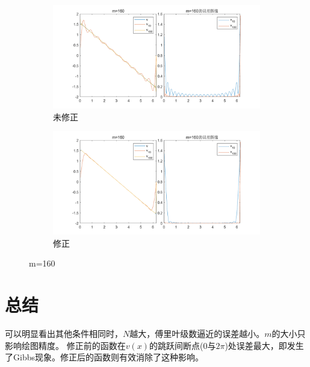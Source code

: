 \documentclass{article}
\begin{document}
\begin{figure}[htbp]
    \centering
    \begin{subfigure}[b]{0.47\textwidth}
        \centering
        \includegraphics[width=\textwidth]{m=160.png}
        \caption{未修正}
    \end{subfigure}
    \begin{subfigure}[b]{0.47\textwidth}
        \centering
        \includegraphics[width=\textwidth]{m=160修正.png}
        \caption{修正}
    \end{subfigure}
    \caption{m=160}
\end{figure}

\section{总结}
可以明显看出其他条件相同时，$N$越大，傅里叶级数逼近的误差越小。$m$的大小只影响绘图精度。
修正前的函数在$v(x)$的跳跃间断点($0$与$2\pi$)处误差最大，即发生了Gibbs现象。修正后的函数则有效消除了这种影响。
\end{document}
